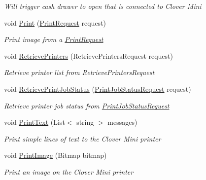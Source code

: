 \begin{DoxyCompactItemize}
\begin{DoxyCompactList}\small\item\em Will trigger cash drawer to open that is connected to Clover Mini \end{DoxyCompactList}\item 
void \hyperlink{classcom_1_1clover_1_1remotepay_1_1sdk_1_1_clover_connector_aefaa2e93fe6c7b01f6b271a42e684132}{Print} (\hyperlink{classcom_1_1clover_1_1remotepay_1_1sdk_1_1_print_request}{Print\+Request} request)
\begin{DoxyCompactList}\small\item\em Print image from a \hyperlink{classcom_1_1clover_1_1remotepay_1_1sdk_1_1_print_request}{Print\+Request} \end{DoxyCompactList}\item 
void \hyperlink{classcom_1_1clover_1_1remotepay_1_1sdk_1_1_clover_connector_af655f211944ed467d58eb816e5752c3c}{Retrieve\+Printers} (Retrieve\+Printers\+Request request)
\begin{DoxyCompactList}\small\item\em Retrieve printer list from Retrieve\+Printers\+Request \end{DoxyCompactList}\item 
void \hyperlink{classcom_1_1clover_1_1remotepay_1_1sdk_1_1_clover_connector_a9c52815121d86654b8372a24b05874bd}{Retrieve\+Print\+Job\+Status} (\hyperlink{classcom_1_1clover_1_1remotepay_1_1sdk_1_1_print_job_status_request}{Print\+Job\+Status\+Request} request)
\begin{DoxyCompactList}\small\item\em Retrieve printer job status from \hyperlink{classcom_1_1clover_1_1remotepay_1_1sdk_1_1_print_job_status_request}{Print\+Job\+Status\+Request} \end{DoxyCompactList}\item 
void \hyperlink{classcom_1_1clover_1_1remotepay_1_1sdk_1_1_clover_connector_a1601ef2709d1e2eb53fa92ff1ee46823}{Print\+Text} (List$<$ string $>$ messages)
\begin{DoxyCompactList}\small\item\em Print simple lines of text to the Clover Mini printer \end{DoxyCompactList}\item 
void \hyperlink{classcom_1_1clover_1_1remotepay_1_1sdk_1_1_clover_connector_a4743d4155d22ddc978602814cb72ee6b}{Print\+Image} (Bitmap bitmap)
\begin{DoxyCompactList}\small\item\em Print an image on the Clover Mini printer \end{DoxyCompactList}\end{DoxyCompactItemize}
